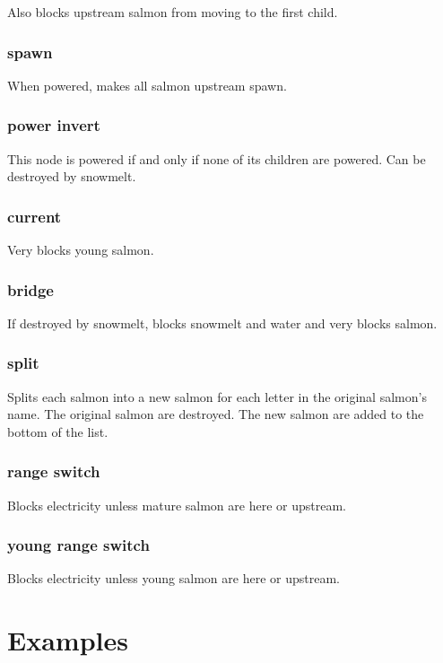 \documentclass[10pt]{article}
\begin{document}
Also blocks upstream salmon from moving to the first child.

\subsubsection{spawn}

When powered, makes all salmon upstream spawn.

\subsubsection{power invert}

This node is powered if and only if none of its children are powered. Can be destroyed by snowmelt.

\subsubsection{current}

Very blocks young salmon.

\subsubsection{bridge}

If destroyed by snowmelt, blocks snowmelt and water and very blocks salmon.

\subsubsection{split}

Splits each salmon into a new salmon for each letter in the original salmon's name. The original salmon are destroyed. The new salmon are added to the bottom of the list.

\subsubsection{range switch}

Blocks electricity unless mature salmon are here or upstream.

\subsubsection{young range switch}

Blocks electricity unless young salmon are here or upstream.

\section{Examples}
\end{document}
